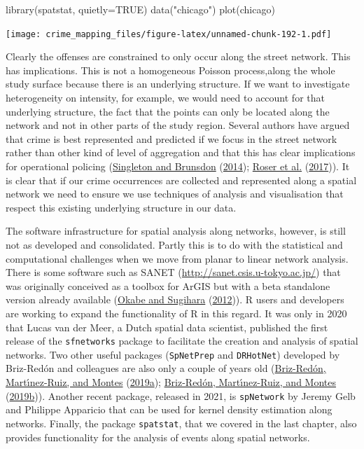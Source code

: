 \documentclass[
  krantz2]{krantz}
\makeatletter
\newenvironment{Shaded}{\begin{snugshade}}{\end{snugshade}}
\newcommand{\AttributeTok}[1]{\textcolor[rgb]{0.61,0.61,0.61}{#1}}
\newcommand{\ConstantTok}[1]{\textcolor[rgb]{0,0,0}{#1}}
\newcommand{\FunctionTok}[1]{\textcolor[rgb]{0,0,0}{#1}}
\newcommand{\NormalTok}[1]{#1}
\newcommand{\StringTok}[1]{\textcolor[rgb]{0.5,0.5,0.5}{#1}}
\newenvironment{kframe}{%
\medskip{}
\setlength{\fboxsep}{.8em}
 \def\at@end@of@kframe{}%
 \ifinner\ifhmode%
  \def\at@end@of@kframe{\end{minipage}}%
  \begin{minipage}{\columnwidth}%
 \fi\fi%
 \def\FrameCommand##1{\hskip\@totalleftmargin \hskip-\fboxsep
 \colorbox{shadecolor}{##1}\hskip-\fboxsep
     \hskip-\linewidth \hskip-\@totalleftmargin \hskip\columnwidth}%
 \MakeFramed {\advance\hsize-\width
   \@totalleftmargin\z@ \linewidth\hsize
   \@setminipage}}%
 {\par\unskip\endMakeFramed%
 \at@end@of@kframe}
\renewenvironment{Shaded}{\begin{kframe}}{\end{kframe}}
\makeatother
\begin{document}
\begin{Shaded}
\begin{Highlighting}[]
\FunctionTok{library}\NormalTok{(spatstat, }\AttributeTok{quietly=}\ConstantTok{TRUE}\NormalTok{)}
\FunctionTok{data}\NormalTok{(}\StringTok{"chicago"}\NormalTok{)}
\FunctionTok{plot}\NormalTok{(chicago)}
\end{Highlighting}
\end{Shaded}

\texttt{[image: crime\_mapping\_files/figure-latex/unnamed-chunk-192-1.pdf]}

Clearly the offenses are constrained to only occur along the street network. This has implications. This is not a homogeneous Poisson process,along the whole study surface because there is an underlying structure. If we want to investigate heterogeneity on intensity, for example, we would need to account for that underlying structure, the fact that the points can only be located along the network and not in other parts of the study region. Several authors have argued that crime is best represented and predicted if we focus in the street network rather than other kind of level of aggregation and that this has clear implications for operational policing (\protect\hyperlink{ref-Singleton_2014}{Singleton and Brunsdon} (\protect\hyperlink{ref-Singleton_2014}{2014}); \protect\hyperlink{ref-Rosser_2017}{Roser et al.} (\protect\hyperlink{ref-Rosser_2017}{2017})). It is clear that if our crime occurrences are collected and represented along a spatial network we need to ensure we use techniques of analysis and visualisation that respect this existing underlying structure in our data.

The software infrastructure for spatial analysis along networks, however, is still not as developed and consolidated. Partly this is to do with the statistical and computational challenges when we move from planar to linear network analysis. There is some software such as SANET (\url{http://sanet.csis.u-tokyo.ac.jp/}) that was originally conceived as a toolbox for ArGIS but with a beta standalone version already available (\protect\hyperlink{ref-Okabe_2012}{Okabe and Sugihara} (\protect\hyperlink{ref-Okabe_2012}{2012})). R users and developers are working to expand the functionality of R in this regard. It was only in 2020 that Lucas van der Meer, a Dutch spatial data scientist, published the first release of the \texttt{sfnetworks} package to facilitate the creation and analysis of spatial networks. Two other useful packages (\texttt{SpNetPrep} and \texttt{DRHotNet}) developed by Briz-Redón and colleagues are also only a couple of years old (\protect\hyperlink{ref-BrizRedon_2019a}{Briz-Redón, Martı́nez-Ruiz, and Montes} (\protect\hyperlink{ref-BrizRedon_2019a}{2019a}); \protect\hyperlink{ref-BrizRedon_2019b}{Briz-Redón, Martı́nez-Ruiz, and Montes} (\protect\hyperlink{ref-BrizRedon_2019b}{2019b})). Another recent package, released in 2021, is \texttt{spNetwork} by Jeremy Gelb and Philippe Apparicio that can be used for kernel density estimation along networks. Finally, the package \texttt{spatstat}, that we covered in the last chapter, also provides functionality for the analysis of events along spatial networks.
\end{document}
